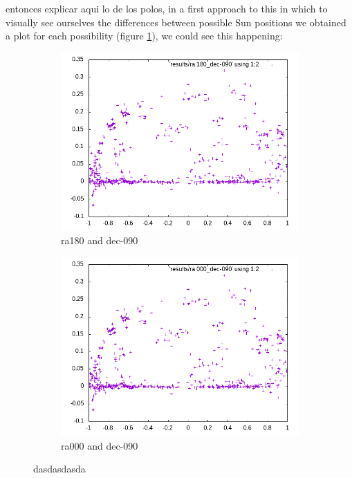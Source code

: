 entonces explicar aqui lo de los polos, in a first approach to this in which to visually see ourselves the differences between possible Sun positions we obtained a plot for each possibility (figure \ref{fig:poles}), we could see this happening:

\begin{figure}[!htb]
	\begin{subfigure}[b]{0.5\textwidth}
		\includegraphics[width=\linewidth]{images/ch4/ra180_dec-090.png}
		\caption{ra180 and dec-090}
	\end{subfigure}
	\hfill
	\begin{subfigure}[b]{0.5\textwidth}
		\includegraphics[width=\linewidth]{images/ch4/ra000_dec-090.png}
		\caption{ra000 and dec-090}
	\end{subfigure}
	\caption{dasdasdasda}
	\label{fig:poles}
\end{figure}

